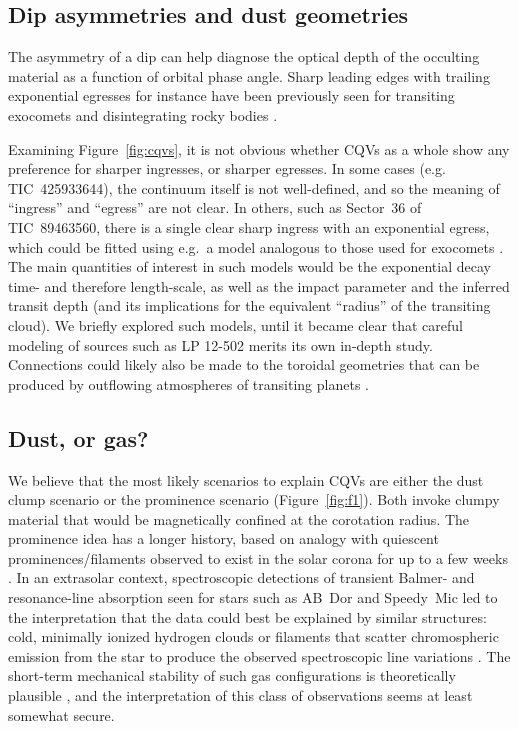 \documentclass[11pt,twocolumn,tighten]{aastex63}
\begin{document}
\subsection{Dip asymmetries and dust geometries}

The asymmetry of a dip can help diagnose the optical depth of the
occulting material as a function of orbital phase angle.  Sharp
leading edges with trailing exponential egresses for instance have
been previously seen for transiting exocomets and disintegrating rocky
bodies
\citep[e.g.][]{2012ApJ...752....1R,2012A&A...545L...5B,2015Natur.526..546V,2019A&A...625L..13Z}.

Examining Figure~\ref{fig:cqvs}, it is not obvious whether CQVs as a
whole show any preference for sharper ingresses, or sharper egresses.
In some cases (e.g. TIC~425933644), the continuum itself is not
well-defined, and so the meaning of ``ingress'' and ``egress'' are not
clear.  In others, such as Sector~36 of TIC~89463560, there is a
single clear sharp ingress with an exponential egress, which could be
fitted using e.g.~a model analogous to those used for exocomets
\citep[e.g.][]{2018MNRAS.474.1453R,2019A&A...625L..13Z}.  The main quantities of interest
in such models would be the exponential decay time- and therefore
length-scale, as well as the impact parameter and the inferred transit
depth (and its implications for the equivalent ``radius'' of the
transiting cloud).  We briefly explored such models, until it
became clear that careful modeling of sources such as LP
12-502 merits its own in-depth study.  Connections could likely also
be made to the toroidal geometries that can be produced by outflowing
atmospheres of transiting planets
\citep[e.g.][]{2019ApJ...873...89M,2022ApJ...926..226M}.



\subsection{Dust, or gas?}

We believe that the most likely scenarios to explain CQVs are either
the dust clump scenario or the prominence scenario
(Figure~\ref{fig:f1}).  Both invoke clumpy material that would be
magnetically confined at the corotation radius.  The prominence idea
has a longer history, based on analogy with quiescent
prominences/filaments observed to exist in the solar corona for up to
a few weeks \citep[see][]{2015ASSL..415.....V}.  In an extrasolar
context, spectroscopic detections of transient Balmer- and
resonance-line absorption seen for stars such as AB~Dor and Speedy~Mic
\citep[e.g.][]{1989MNRAS.238..657C,1993MNRAS.262..369J,2006MNRAS.365..530D,2016MNRAS.463..965L}
led to the interpretation that the data could best be explained by
similar structures: cold, minimally ionized hydrogen clouds or
filaments that scatter chromospheric emission from the star to produce
the observed spectroscopic line variations
\citep[see][]{1989MNRAS.238..657C}.  The short-term mechanical
stability of such gas configurations is theoretically plausible
\citep{2000MNRAS.316..647F,2022MNRAS.514.5465W}, and the
interpretation of this class of observations seems at least somewhat
secure.
\end{document}
